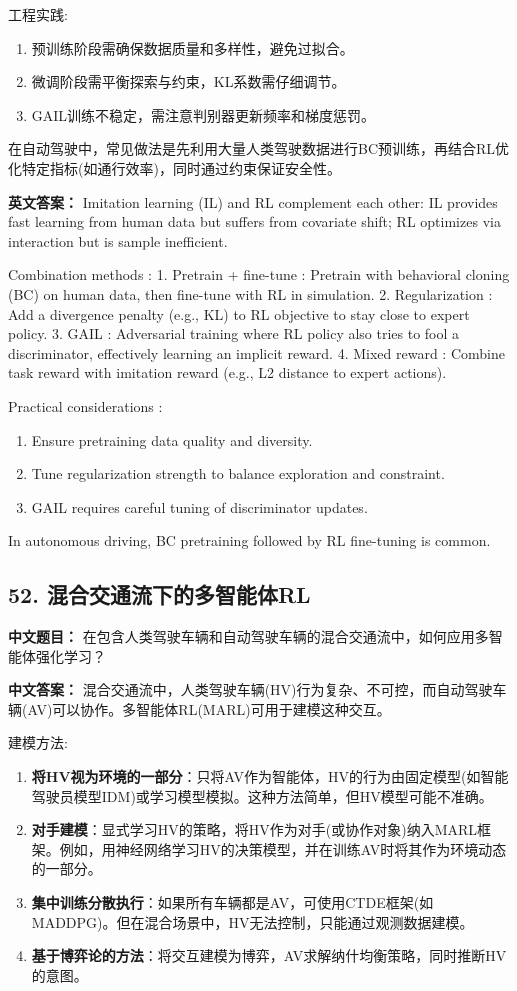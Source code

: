 \documentclass[10pt,a4paper]{ctexart}
\begin{document}
 工程实践:
\begin{enumerate}
    \item 预训练阶段需确保数据质量和多样性，避免过拟合。
    \item 微调阶段需平衡探索与约束，KL系数需仔细调节。
    \item GAIL训练不稳定，需注意判别器更新频率和梯度惩罚。
\end{enumerate}

在自动驾驶中，常见做法是先利用大量人类驾驶数据进行BC预训练，再结合RL优化特定指标(如通行效率)，同时通过约束保证安全性。

\textbf{英文答案：}  
Imitation learning (IL) and RL complement each other: IL provides fast learning from human data but suffers from covariate shift; RL optimizes via interaction but is sample inefficient.

 Combination methods :
1.  Pretrain + fine-tune : Pretrain with behavioral cloning (BC) on human data, then fine-tune with RL in simulation.
2.  Regularization : Add a divergence penalty (e.g., KL) to RL objective to stay close to expert policy.
3.  GAIL : Adversarial training where RL policy also tries to fool a discriminator, effectively learning an implicit reward.
4.  Mixed reward : Combine task reward with imitation reward (e.g., L2 distance to expert actions).

 Practical considerations :
\begin{enumerate}
    \item Ensure pretraining data quality and diversity.
    \item Tune regularization strength to balance exploration and constraint.
    \item GAIL requires careful tuning of discriminator updates.
\end{enumerate}

In autonomous driving, BC pretraining followed by RL fine-tuning is common.

\subsection*{52. 混合交通流下的多智能体RL}
\textbf{中文题目：} 在包含人类驾驶车辆和自动驾驶车辆的混合交通流中，如何应用多智能体强化学习？

\textbf{中文答案：}  
混合交通流中，人类驾驶车辆(HV)行为复杂、不可控，而自动驾驶车辆(AV)可以协作。多智能体RL(MARL)可用于建模这种交互。

 建模方法:
\begin{enumerate}
    \item \textbf{将HV视为环境的一部分}：只将AV作为智能体，HV的行为由固定模型(如智能驾驶员模型IDM)或学习模型模拟。这种方法简单，但HV模型可能不准确。
    \item \textbf{对手建模}：显式学习HV的策略，将HV作为对手(或协作对象)纳入MARL框架。例如，用神经网络学习HV的决策模型，并在训练AV时将其作为环境动态的一部分。
    \item \textbf{集中训练分散执行}：如果所有车辆都是AV，可使用CTDE框架(如MADDPG)。但在混合场景中，HV无法控制，只能通过观测数据建模。
    \item \textbf{基于博弈论的方法}：将交互建模为博弈，AV求解纳什均衡策略，同时推断HV的意图。
\end{enumerate}
\end{document}
